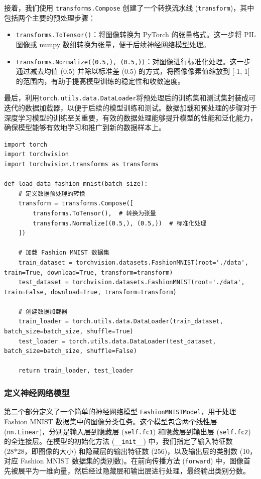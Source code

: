 \documentclass[a4paper,12pt]{article}
\begin{document}
接着，我们使用 \texttt{transforms.Compose} 创建了一个转换流水线 (\texttt{transform})，其中包括两个主要的预处理步骤：

\begin{itemize}
    \item \texttt{transforms.ToTensor()}：将图像转换为 PyTorch 的张量格式。这一步将 PIL 图像或 numpy 数组转换为张量，便于后续神经网络模型处理。
    
    \item \texttt{transforms.Normalize((0.5,), (0.5,))}：对图像进行标准化处理。这一步通过减去均值 (0.5) 并除以标准差 (0.5) 的方式，将图像像素值缩放到 [-1, 1] 的范围内，有助于提高模型训练的稳定性和收敛速度。
\end{itemize}

最后，利用\texttt{torch.utils.data.DataLoader}将预处理后的训练集和测试集封装成可迭代的数据加载器，以便于后续的模型训练和测试。数据加载和预处理的步骤对于深度学习模型的训练至关重要，有效的数据处理能够提升模型的性能和泛化能力，确保模型能够有效地学习和推广到新的数据样本上。

\begin{lstlisting}
import torch
import torchvision
import torchvision.transforms as transforms

def load_data_fashion_mnist(batch_size):
    # 定义数据预处理的转换
    transform = transforms.Compose([
        transforms.ToTensor(),  # 转换为张量
        transforms.Normalize((0.5,), (0.5,))  # 标准化处理
    ])

    # 加载 Fashion MNIST 数据集
    train_dataset = torchvision.datasets.FashionMNIST(root='./data', train=True, download=True, transform=transform)
    test_dataset = torchvision.datasets.FashionMNIST(root='./data', train=False, download=True, transform=transform)

    # 创建数据加载器
    train_loader = torch.utils.data.DataLoader(train_dataset, batch_size=batch_size, shuffle=True)
    test_loader = torch.utils.data.DataLoader(test_dataset, batch_size=batch_size, shuffle=False)

    return train_loader, test_loader

\end{lstlisting}

\subsubsection{定义神经网络模型}
第二个部分定义了一个简单的神经网络模型 \texttt{FashionMNISTModel}，用于处理 Fashion MNIST 数据集中的图像分类任务。这个模型包含两个线性层 (\texttt{nn.Linear})，分别是输入层到隐藏层 (\texttt{self.fc1}) 和隐藏层到输出层 (\texttt{self.fc2}) 的全连接层。在模型的初始化方法 (\texttt{\_\_init\_\_}) 中，我们指定了输入特征数 (28*28，即图像的大小) 和隐藏层的输出特征数 (256)，以及输出层的类别数 (10，对应 Fashion MNIST 数据集的类别数)。在前向传播方法 (\texttt{forward}) 中，图像首先被展平为一维向量，然后经过隐藏层和输出层进行处理，最终输出类别分数。
\end{document}
